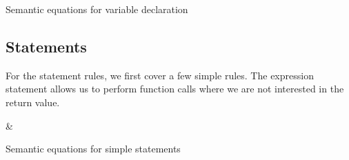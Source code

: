 \begin{table}[H]
\begin{semanticequations}
 \seSpace
\end{semanticequations}
\caption{Semantic equations for variable declaration}
\label{cstr:variabledeclaration}
\end{table}

\subsection{Statements}
For the statement rules, we first cover a few simple rules.
The expression statement allows us to perform function calls where we are not interested in the return value.

\begin{table}[H]
\begin{semanticequations}
&\semeq{\iS}{\varepsilon}{\ienvL \; \ienvF}{(\emptyset, \ienvL)} \seSpace
 \seSpace
\end{semanticequations}
\caption{Semantic equations for simple statements}
\label{cstr:statements}
\end{table}

